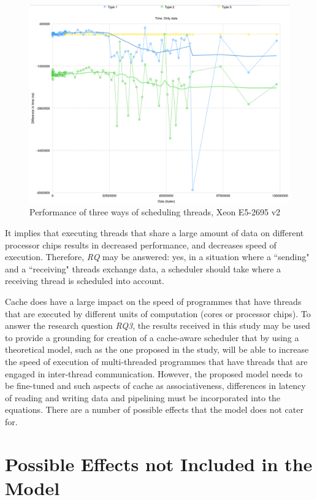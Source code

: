 \begin{figure}[ht!]
\centering
\includegraphics[width=145mm]{7/thread-placement-ichec.png}
\caption{Performance of three ways of scheduling threads, Xeon E5-2695 v2}
\label{thread-placement-ichec}
\end{figure}

It implies that executing threads that share a large amount of data on different processor chips results in decreased performance, and decreases speed of execution. Therefore, \textit{RQ} may be answered: yes, in a situation where a ``sending" and a ``receiving" threads exchange data, a scheduler should take where a receiving thread is scheduled into account.

Cache does have a large impact on the speed of programmes that have threads that are executed by different units of computation (cores or processor chips). To answer the research question \textit{RQ3}, the results received in this study may be used to provide a grounding for creation of a cache-aware scheduler that by using a theoretical model, such as the one proposed in the study, will be able to increase the speed of execution of multi-threaded programmes that have threads that are engaged in inter-thread communication. However, the proposed model needs to be fine-tuned and such aspects of cache as associativeness, differences in latency of reading and writing data and pipelining must be incorporated into the equations. There are a number of possible effects that the model does not cater for.

\section{Possible Effects not Included in the Model}
\label{possibleeffects}


